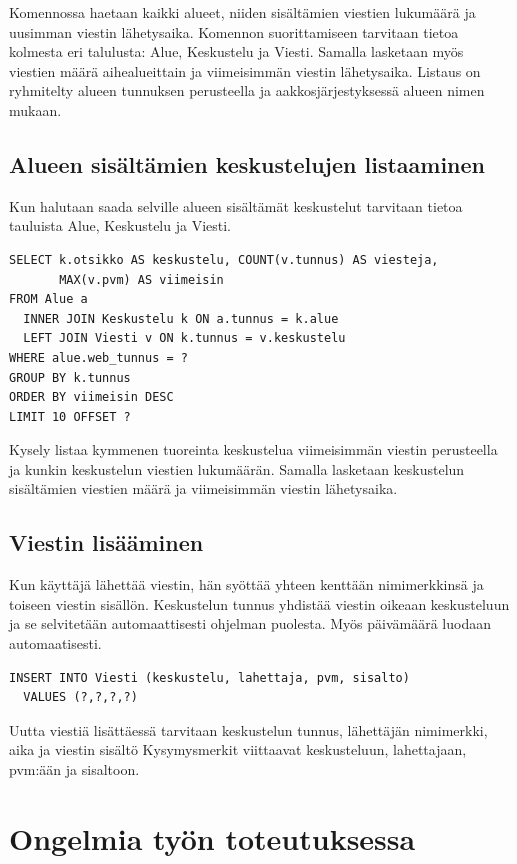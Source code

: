\documentclass[titlepage]{article}
\begin{document}
\noindent
Komennossa haetaan kaikki alueet, niiden sisältämien viestien lukumäärä ja uusimman viestin lähetysaika. Komennon suorittamiseen tarvitaan tietoa kolmesta eri talulusta: Alue, Keskustelu ja Viesti. Samalla lasketaan myös viestien määrä aihealueittain ja viimeisimmän viestin lähetysaika. Listaus on ryhmitelty alueen tunnuksen perusteella ja aakkosjärjestyksessä alueen nimen mukaan.

\subsection*{Alueen sisältämien keskustelujen listaaminen}

Kun halutaan saada selville alueen sisältämät keskustelut tarvitaan tietoa tauluista Alue, Keskustelu ja Viesti.

\begin{verbatim}
SELECT k.otsikko AS keskustelu, COUNT(v.tunnus) AS viesteja,
       MAX(v.pvm) AS viimeisin 
FROM Alue a
  INNER JOIN Keskustelu k ON a.tunnus = k.alue
  LEFT JOIN Viesti v ON k.tunnus = v.keskustelu
WHERE alue.web_tunnus = ?
GROUP BY k.tunnus
ORDER BY viimeisin DESC
LIMIT 10 OFFSET ?
\end{verbatim}

\noindent Kysely listaa kymmenen tuoreinta keskustelua viimeisimmän viestin perusteella ja kunkin keskustelun viestien lukumäärän. Samalla lasketaan keskustelun sisältämien viestien määrä ja viimeisimmän viestin lähetysaika. 


\subsection*{Viestin lisääminen}

\noindent Kun käyttäjä lähettää viestin, hän syöttää yhteen kenttään nimimerkkinsä ja toiseen viestin sisällön. Keskustelun tunnus yhdistää viestin oikeaan keskusteluun ja se selvitetään automaattisesti ohjelman puolesta. Myös päivämäärä luodaan automaatisesti.

\begin{verbatim}
INSERT INTO Viesti (keskustelu, lahettaja, pvm, sisalto)
  VALUES (?,?,?,?)
\end{verbatim}

\noindent Uutta viestiä lisättäessä tarvitaan keskustelun tunnus, lähettäjän nimimerkki, aika ja viestin sisältö Kysymysmerkit viittaavat keskusteluun, lahettajaan, pvm:ään ja sisaltoon.

\section*{Ongelmia työn toteutuksessa}
\end{document}
